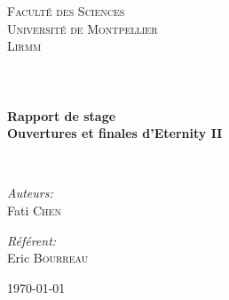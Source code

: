 

\begin{titlepage}
	\begin{center}
	
	
	\textsc{\LARGE Faculté des Sciences\\
		Université de Montpellier\\
		Lirmm\\} \ \\[1.5cm]
	
	\textsc{\Large }\\[0.5cm]
	
	\HRule \\[0.4cm]
	
	{\huge \bfseries Rapport de stage\\
	Ouvertures et finales d'Eternity II\\[0.4cm] }
	
	\HRule \\[1.5cm]
	
	\begin{minipage}{0.4\textwidth}
		\begin{flushleft} \large
			\emph{Auteurs:}\\
				Fati \textsc{Chen}\\
		\end{flushleft}
	\end{minipage}
	\begin{minipage}{0.4\textwidth}
		\begin{flushright} \large
			\emph{Référent:} \\
				Eric \textsc{Bourreau}
		\end{flushright}
	\end{minipage}
	
	\vfill
	\thispagestyle{empty}

	{\large \today}
	\end{center}
\end{titlepage}

